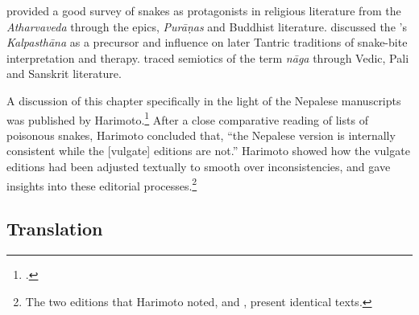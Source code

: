         \citet{doni-2015} provided a good survey of snakes as protagonists
in religious literature from the \emph{Atharvaveda} through the
epics, \emph{Purāṇas} and Buddhist literature. \citet[31--33
\emph{et passim}]{slou-2016} discussed the \SS's \emph{Kalpasthāna}
as a precursor and influence on later Tantric traditions of
snake-bite interpretation and therapy.  \citet{seme-1979} traced
semiotics of the term \emph{nāga} through Vedic, Pali and Sanskrit
literature.
    
    
A discussion of this chapter specifically in the light of the Nepalese
manuscripts was published by Harimoto.\footcite[101--104]{hari-2011} After a
close comparative reading of lists of poisonous snakes, Harimoto concluded
that, “the Nepalese version is internally consistent while the [vulgate]
editions are not.”  Harimoto showed how the vulgate editions had been
adjusted textually to smooth over inconsistencies, and gave insights into
these editorial processes.\footnote{The two editions that Harimoto noted,
    \cite{vulgate} and \cite{bhat-1889}, present identical texts.}


\subsection{Translation}

